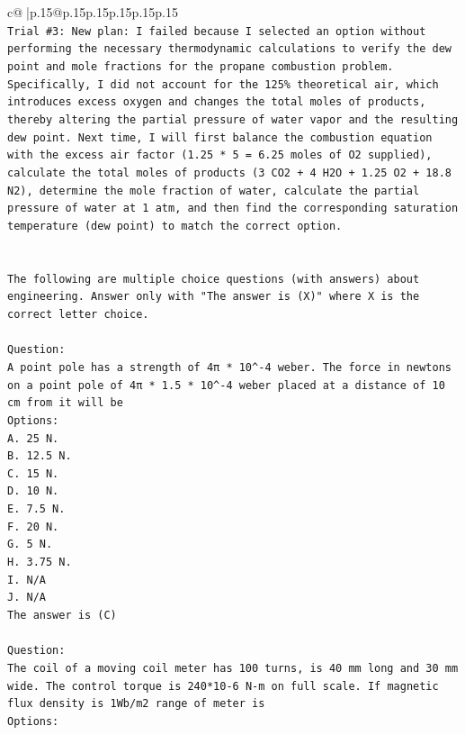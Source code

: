 \documentclass{article}
\begin{document}
{\begin{supertabular}{c@{$\;$}|p{.15\linewidth}@{}p{.15\linewidth}p{.15\linewidth}p{.15\linewidth}p{.15\linewidth}p{.15\linewidth}}
{{{\\ 
\texttt{Trial \#3: New plan: I failed because I selected an option without performing the necessary thermodynamic calculations to verify the dew point and mole fractions for the propane combustion problem. Specifically, I did not account for the 125\% theoretical air, which introduces excess oxygen and changes the total moles of products, thereby altering the partial pressure of water vapor and the resulting dew point. Next time, I will first balance the combustion equation with the excess air factor (1.25 * 5 = 6.25 moles of O2 supplied), calculate the total moles of products (3 CO2 + 4 H2O + 1.25 O2 + 18.8 N2), determine the mole fraction of water, calculate the partial pressure of water at 1 atm, and then find the corresponding saturation temperature (dew point) to match the correct option.} \\
\\ 
\\ 
\texttt{The following are multiple choice questions (with answers) about engineering. Answer only with "The answer is (X)" where X is the correct letter choice.} \\
\\ 
\texttt{Question:} \\
\texttt{A point pole has a strength of 4π * 10\^{}{-}4 weber. The force in newtons on a point pole of 4π * 1.5 * 10\^{}{-}4 weber placed at a distance of 10 cm from it will be} \\
\texttt{Options:} \\
\texttt{A. 25 N.} \\
\texttt{B. 12.5 N.} \\
\texttt{C. 15 N.} \\
\texttt{D. 10 N.} \\
\texttt{E. 7.5 N.} \\
\texttt{F. 20 N.} \\
\texttt{G. 5 N.} \\
\texttt{H. 3.75 N.} \\
\texttt{I. N/A} \\
\texttt{J. N/A} \\
\texttt{The answer is (C)} \\
\\ 
\texttt{Question:} \\
\texttt{The coil of a moving coil meter has 100 turns, is 40 mm long and 30 mm wide. The control torque is 240*10{-}6 N{-}m on full scale. If magnetic flux density is 1Wb/m2 range of meter is} \\
\texttt{Options:} \\
}}}
\end{supertabular}}
\end{document}
